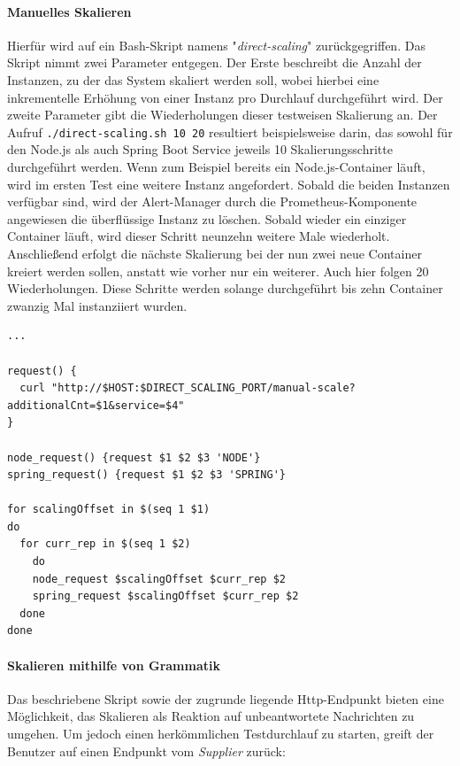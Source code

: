 \label{erklaerungDirScal}
\paragraph{Manuelles Skalieren \checkmark}
Hierfür wird auf ein Bash-Skript namens "\emph{direct-scaling}" zurückgegriffen. Das Skript nimmt zwei Parameter entgegen. Der Erste beschreibt die Anzahl der Instanzen, zu der das System skaliert werden soll, wobei hierbei eine inkrementelle Erhöhung von einer Instanz pro Durchlauf durchgeführt wird. Der zweite Parameter gibt die Wiederholungen dieser testweisen Skalierung an. Der Aufruf \verb+./direct-scaling.sh 10 20+ resultiert beispielsweise darin, das sowohl für den Node.js als auch Spring Boot Service jeweils 10 Skalierungsschritte durchgeführt werden. Wenn zum Beispiel bereits ein Node.js-Container läuft, wird im ersten Test eine weitere Instanz angefordert. Sobald die beiden Instanzen verfügbar sind, wird der Alert-Manager durch die Prometheus-Komponente angewiesen die überflüssige Instanz zu löschen. Sobald wieder ein einziger Container läuft, wird dieser Schritt neunzehn weitere Male wiederholt. Anschließend erfolgt die nächste Skalierung bei der nun zwei neue Container kreiert werden sollen, anstatt wie vorher nur ein weiterer. Auch hier folgen 20 Wiederholungen. Diese Schritte werden solange durchgeführt bis zehn Container zwanzig Mal instanziiert wurden.

\label{lst:direct-scaling}
\begin{minipage}{\linewidth}
\begin{lstlisting}[caption={direct-scaling},style=bashStyle]
...

request() {
  curl "http://$HOST:$DIRECT_SCALING_PORT/manual-scale?additionalCnt=$1&service=$4"
}

node_request() {request $1 $2 $3 'NODE'}
spring_request() {request $1 $2 $3 'SPRING'}

for scalingOffset in $(seq 1 $1)
do 
  for curr_rep in $(seq 1 $2)
	do 
    node_request $scalingOffset $curr_rep $2
    spring_request $scalingOffset $curr_rep $2
  done
done
\end{lstlisting}
\end{minipage}
\paragraph{Skalieren mithilfe von Grammatik}
Das beschriebene Skript sowie der zugrunde liegende Http-Endpunkt bieten eine Möglichkeit, das Skalieren als Reaktion auf unbeantwortete Nachrichten zu umgehen. Um jedoch einen herkömmlichen Testdurchlauf zu starten, greift der Benutzer auf einen Endpunkt vom \emph{Supplier} zurück: 

